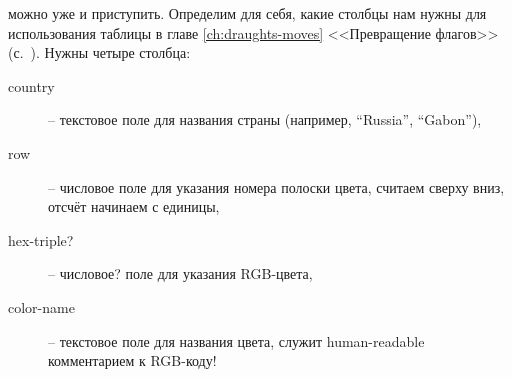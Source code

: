  можно уже и приступить. 
Определим для себя, какие столбцы нам нужны для использования таблицы 
в главе \ref{ch:draughts-moves} <<Превращение флагов>> (с.~\pageref{ch:draughts-moves}). 
Нужны четыре столбца:

\begin{description}
    \item[country] -- текстовое поле для названия страны (например, ``Russia'', ``Gabon''),
    \item[row] -- числовое поле для указания номера полоски цвета, считаем сверху вниз, отсчёт начинаем с единицы,
    \item[hex-triple?] -- числовое? поле для указания RGB-цвета,
    \item[color-name] -- текстовое поле для названия цвета, служит human-readable комментарием к RGB-коду!
\end{description}



